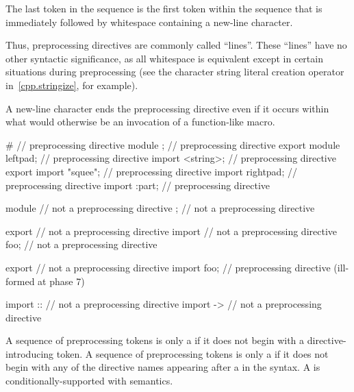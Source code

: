 The last token in the sequence is the first token within the sequence that
is immediately followed by whitespace containing a new-line character.
\begin{footnote}
Thus,
preprocessing directives are commonly called ``lines''.
These ``lines'' have no other syntactic significance,
as all whitespace is equivalent except in certain situations
during preprocessing (see the
\tcode{\#}
character string literal creation operator in~\ref{cpp.stringize}, for example).
\end{footnote}
\begin{note}
A new-line character ends the preprocessing directive even if it occurs
within what would otherwise be an invocation of a function-like macro.
\end{note}

\begin{example}
\begin{codeblock}
#                       // preprocessing directive
module ;                // preprocessing directive
export module leftpad;  // preprocessing directive
import <string>;        // preprocessing directive
export import "squee";  // preprocessing directive
import rightpad;        // preprocessing directive
import :part;           // preprocessing directive

module                  // not a preprocessing directive
;                       // not a preprocessing directive

export                  // not a preprocessing directive
import                  // not a preprocessing directive
foo;                    // not a preprocessing directive

export                  // not a preprocessing directive
import foo;             // preprocessing directive (ill-formed at phase 7)

import ::               // not a preprocessing directive
import ->               // not a preprocessing directive
\end{codeblock}
\end{example}

\pnum
A sequence of preprocessing tokens is only a 
if it does not begin with a directive-introducing token.
A sequence of preprocessing tokens is only a 
if it does not begin with any of the directive names
appearing after a \tcode{\#} in the syntax.
A  is
conditionally-supported with
semantics.

